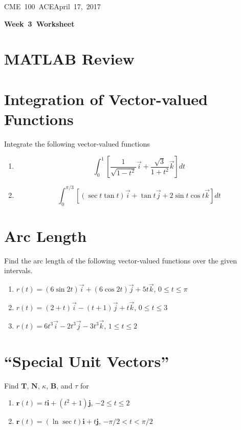 \documentclass[letterpaper, 11pt]{article}
\makeatletter
\newcommand{\hmwkTitle}{Week\ 3\ Worksheet} %
\newcommand{\hmwkClass}{CME\ 100\ ACE} %
\newcommand{\hmwkAuthorName}{Timothy Anderson} %
\newcommand{\hmwkAuthorEmail}{timmya@stanford.edu} %
\makeatother
\begin{document}
\noindent
\normalsize 
\hmwkClass \hfill April\ 17,\ 2017\\

\begin{center} \Large \textbf{\hmwkTitle} \end{center}

\section{MATLAB Review}


\section{Integration of Vector-valued Functions}
Integrate the following vector-valued functions
\begin{enumerate}[label=(\alph*)]
\item \[ \int_0^1 \left[ \frac{1}{\sqrt{1 - t^2}} \vec i + \frac{\sqrt{3}}{1 + t^2} \vec k \right] dt \]

\item \[ \int_0^{\pi/3} \left[ (\sec t \tan t) \vec i + \tan t \vec j + 2 \sin t \cos t \vec k \right] dt \]


\end{enumerate}

\section{Arc Length}
Find the arc length of the following vector-valued functions over the given intervals.
\begin{enumerate}[label= (\alph*)]
\item $r(t)= (6\sin2t)\vec i+(6\cos2t)\vec j+5t\vec k$, $0\leq t \leq \pi$

\item $r(t)=(2+t)\vec i-(t+1)\vec j+t\vec k$, $0\leq t \leq 3$

\item $r(t) = 6t^3\vec i - 2t^3 \vec j - 3t^3 \vec k$, $1 \leq t \leq 2$

\end{enumerate}

\section{``Special Unit Vectors''}
Find $\bm{T}$, $\bm{N}$, $\kappa$, $\bm{B}$, and $\tau$ for
\begin{enumerate}[label=(\alph*)]
\item $\bm{r}(t) = t \bm{i} + (t^2+1) \bm{j}$, $ -2 \leq t \leq 2$
\item $\bm{r}(t)= (\ln\sec t)\bm{i}+t\bm{j}$, $-\pi/2<t<\pi/2$
\end{enumerate}

\end{document}
